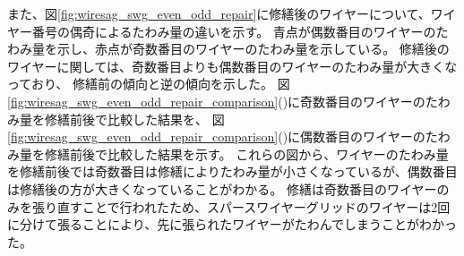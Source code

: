 \documentclass[../../main.tex]{subfiles}
\begin{document}
また、図\ref{fig:wiresag_swg_even_odd_repair}に修繕後のワイヤーについて、ワイヤー番号の偶奇によるたわみ量の違いを示す。
青点が偶数番目のワイヤーのたわみ量を示し、赤点が奇数番目のワイヤーのたわみ量を示している。
修繕後のワイヤーに関しては、奇数番目よりも偶数番目のワイヤーのたわみ量が大きくなっており、
修繕前の傾向と逆の傾向を示した。
図\ref{fig:wiresag_swg_even_odd_repair_comparison}()に奇数番目のワイヤーのたわみ量を修繕前後で比較した結果を、
図\ref{fig:wiresag_swg_even_odd_repair_comparison}()に偶数番目のワイヤーのたわみ量を修繕前後で比較した結果を示す。
これらの図から、ワイヤーのたわみ量を修繕前後では奇数番目は修繕によりたわみ量が小さくなっているが、偶数番目は修繕後の方が大きくなっていることがわかる。
修繕は奇数番目のワイヤーのみを張り直すことで行われたため、スパースワイヤーグリッドのワイヤーは2回に分けて張ることにより、先に張られたワイヤーがたわんでしまうことがわかった。
\end{document}
